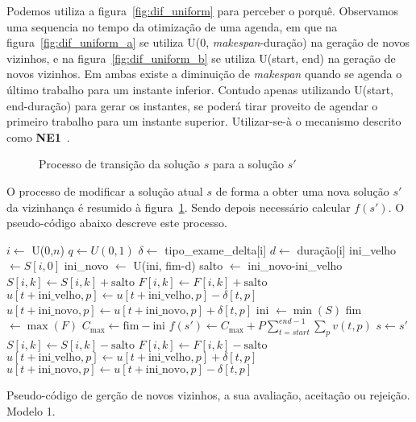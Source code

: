 Podemos utiliza a figura~\ref{fig:dif_uniform} para perceber o porquê. Observamos uma sequencia no tempo da otimização de uma agenda, em que na figura~\ref{fig:dif_uniform_a} se utiliza U(0, \textit{makespan}-duração) na geração de novos vizinhos, e na figura~\ref{fig:dif_uniform_b} se utiliza U(start, end) na geração de novos vizinhos. Em ambas existe a diminuição de \textit{makespan} quando se agenda o último trabalho para um instante inferior. Contudo apenas utilizando U(start, end-duração) para gerar os instantes, se poderá tirar proveito de agendar o primeiro trabalho para um instante superior. Utilizar-se-à o mecanismo descrito como \textbf{NE1}~\cite{franzinRevisitingSimulatedAnnealing2019}.
\begin{figure}[H]
	\centering
	\caption{Processo de transição da solução $s$ para a solução $s'$}
	\label{fig:trans_P1M1_NGV}
\end{figure}
O processo de modificar a solução atual $s$ de forma a obter uma nova solução $s'$ da vizinhança é resumido à figura~\ref{fig:trans_P1M1_NGV}. Sendo depois necessário calcular $f(s')$. O pseudo-código abaixo descreve este processo.\\
\begin{algorithm}[H]
    $i \gets$ U(0,$n$)\;
    $q \gets U(0,1)$\;
    $\delta \gets$ tipo\_exame\_delta[i]\;
    $d \gets$ duração[i]\;
    ini\_velho $\gets S[i, 0]$\;
    ini\_novo $\gets$ U(ini, fim-d)\;
    salto $\gets$ ini\_novo-ini\_velho\;
    {
    $S[i, k] \gets S[i, k]+ \text{salto}$\;
    $F[i, k] \gets F[i, k]+ \text{salto}$\;
    }
	{
    	{
		$u[t+\text{ini\_velho}, p] \gets u[t+\text{ini\_velho}, p] - \delta[t, p]$\;
		$u[t+\text{ini\_novo}, p] \gets u[t+\text{ini\_novo}, p] + \delta[t, p]$\;
    	}
	}
    ini $\gets \min(S)$\;
    fim $\gets \max(F)$\;
    $C_{\max} \gets \text{fim} - \text{ini}$\;
    $f(s') \gets C_{\max} + P \sum_{t=start}^{end-1}\sum_{p}v(t,p)$\;
	{
		$s \gets s'$
	}
	\Else
	{
    {
    $S[i, k] \gets S[i, k]- \text{salto}$\;
    $F[i, k] \gets F[i, k]- \text{salto}$\;
    }
	{
    	{
		$u[t+\text{ini\_velho}, p] \gets u[t+\text{ini\_velho}, p] + \delta[t, p]$\;
		$u[t+\text{ini\_novo}, p] \gets u[t+\text{ini\_novo}, p] - \delta[t, p]$\;
    	}
	}
	}
    \caption{Pseudo-código de gerção de novos vizinhos, a sua avaliação, aceitação ou rejeição. Modelo 1.}
\end{algorithm}

